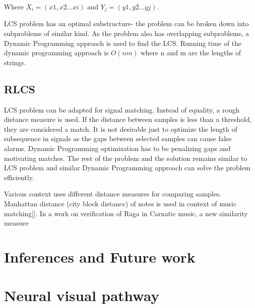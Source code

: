 \documentclass[MTech]{iitmdiss}
\begin{document}
Where $X_i = (x1, x2...xi)$ and $Y_j = (y1, y2...yj)$.

LCS problem has an optimal substructure- the problem can be broken down into subproblems of similar kind. As the problem also has overlapping subproblems, a Dynamic Programming approach is used to find the LCS. Running time of the dynamic programming approach is  $O(nm)$ where n and m are the lengths of strings.

\section{RLCS} %
\label{sec:rlcs}
LCS problem can be adapted for signal matching. Instead of equality, a rough distance measure is used. If the distance between samples is less than a threshold, they are considered a match. It is not desirable just to optimize the length of subsequence in signals as the gaps between selected samples can cause false alarms. Dynamic Programming optimization has to be penalizing gaps and motivating matches. The rest of the problem and the solution remains similar to LCS problem and similar Dynamic Programming approach can solve the problem efficiently.

Various context uses different distance measures for comparing samples.  Manhattan distance (city block distance) of notes is used in context of music matching[\cite{lin2011music}]. In a work on verification of Raga in Carnatic music, a new similarity measure 

\chapter{Inferences and Future work}    %
\label{chap:summary}

\appendix
\chapter{Neural visual pathway}

\pagebreak
\begin{singlespace}
  \begin{small}
	
  \end{small}
\end{singlespace}
\end{document}
